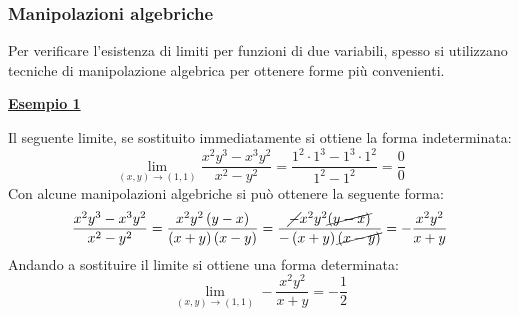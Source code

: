 \documentclass[a4paper]{article}
\newcommand{\example}[1]{\textcolor{Green4}{\textbf{#1}}}
\begin{document}
	\subsubsection{Manipolazioni algebriche}\label{subsubsection: manipolazioni algebriche}

	Per verificare l'esistenza di limiti per funzioni di due variabili, spesso si utilizzano tecniche di manipolazione algebrica per ottenere forme più convenienti.\newline

	\begin{flushleft}
		\example{\underline{Esempio 1}}
	\end{flushleft}
	Il seguente limite, se sostituito immediatamente si ottiene la forma indeterminata:
	\begin{equation*}
		\displaystyle\lim_{\left(x,y\right) \rightarrow \left(1,1\right)} \dfrac{x^{2}y^{3} - x^{3}y^{2}}{x^{2} - y^{2}} = \dfrac{1^2 \cdot 1^{3} - 1^{3} \cdot 1^{2}}{1^{2} - 1^{2}} = \dfrac{0}{0}
	\end{equation*}
	Con alcune manipolazioni algebriche si può ottenere la seguente forma:
	\begin{equation*}
		\dfrac{x^{2}y^{3} - x^{3}y^{2}}{x^{2} - y^{2}} = \dfrac{x^{2}y^{2}\left(y-x\right)}{\left(x+y\right)\left(x-y\right)} = \dfrac{\cancel{-} x^{2}y^{2}\cancel{\left(y-x\right)}}{- \left(x+y\right)\cancel{\left(x-y\right)}} = -\dfrac{x^{2}y^{2}}{x+y}
	\end{equation*}
	Andando a sostituire il limite si ottiene una forma determinata:
	\begin{equation*}
		\displaystyle\lim_{\left(x,y\right) \rightarrow \left(1,1\right)} -\dfrac{x^{2}y^{2}}{x+y} = - \dfrac{1}{2}
	\end{equation*}
\end{document}
